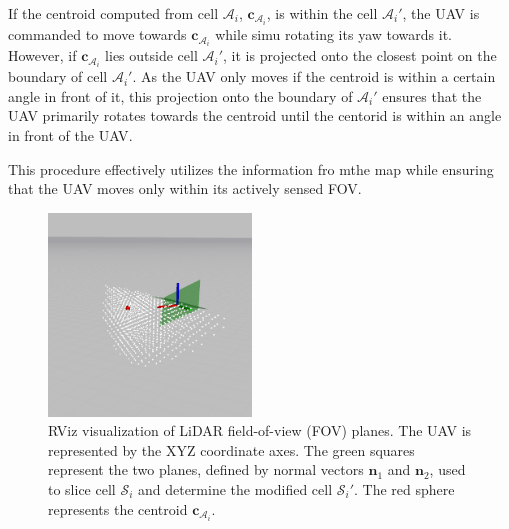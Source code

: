            If the centroid computed from cell $\mathcal{A}_i$, $\mathbf{c}_{\mathcal{A}_i}$, is within the cell $\mathcal{A}_i'$, the \ac{UAV} is commanded to move towards $\mathbf{c}_{\mathcal{A}_i}$ while simu rotating its yaw towards it.
            However, if $\mathbf{c}_{\mathcal{A}_i}$ lies outside cell $\mathcal{A}_i'$, it is projected onto the closest point on the boundary of cell $\mathcal{A}_i'$.
            As the \ac{UAV} only moves if the centroid is within a certain angle in front of it, this projection onto the boundary of $\mathcal{A}_i'$ ensures that the \ac{UAV} primarily rotates towards the centroid until the centorid is within an angle in front of the \ac{UAV}.

            This procedure effectively utilizes the information fro mthe map while ensuring that the \ac{UAV} moves only within its actively sensed \ac{FOV}.

            \begin{figure}[H]
                \centering
                \includegraphics[width=0.48\textwidth]{./fig/rviz/cell_a_sliced_with_planes.png}
                \caption{
                    RViz visualization of LiDAR field-of-view (FOV) planes. The UAV is represented by the XYZ coordinate axes. 
                    The green squares represent the two planes, defined by normal vectors $\mathbf{n}_1$ and $\mathbf{n}_2$, used to slice cell $\mathcal{S}_i$ and determine the modified cell $\mathcal{S}_i'$.
                    The red sphere represents the centroid $\mathbf{c}_{\mathcal{A}_i}$.
                }
                \label{fig:cell_a_sliced}
            \end{figure}



